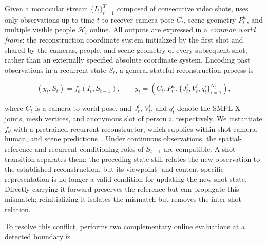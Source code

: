 Given a monocular stream $\{I_t\}_{t=1}^{T}$ composed of consecutive video
shots, \method{} uses only observations up to time $t$ to recover camera pose
$C_t$, scene geometry $P_t^w$, and multiple visible people $\mathcal H_t$
online. All outputs are expressed in a \emph{common world frame}: the
reconstruction coordinate system initialized by the first shot and shared by
the cameras, people, and scene geometry of every subsequent shot, rather than
an externally specified absolute coordinate system. Encoding past observations
in a recurrent state $S_t$, a general stateful reconstruction process is

\begin{equation}
 (y_t,S_t)=f_\theta(I_t,S_{t-1}),\qquad
 y_t=\left(C_t,P_t^w,\{J_t^i,V_t^i,q_t^i\}_{i=1}^{N_t}\right),
 \label{eq:online-map}
\end{equation}

where $C_t$ is a camera-to-world pose, and $J_t^i$, $V_t^i$, and $q_t^i$
denote the SMPL-X~\citep{pavlakos2019smplx} joints, mesh vertices, and
anonymous slot of person $i$, respectively. We instantiate $f_\theta$ with a
pretrained \humanthree{} recurrent reconstructor, which supplies within-shot
camera, human, and scene predictions~\citep{chen2026human3r}. Under continuous
observations, the spatial-reference and recurrent-conditioning roles of
$S_{t-1}$ are compatible. A shot transition separates them: the preceding
state still relates the new observation to the established reconstruction,
but its viewpoint- and content-specific representation is no longer a valid
condition for updating the new-shot state. Directly carrying it forward
preserves the reference but can propagate this mismatch; reinitializing it
isolates the mismatch but removes the inter-shot relation.

To resolve this conflict, \method{} performs two complementary online
evaluations at a detected boundary $b$:


